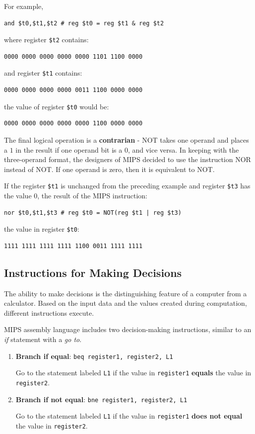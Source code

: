 \documentclass[10pt,a4paper]{article}
\begin{document}
For example, 
\begin{lstlisting}[numbers=none]
    and $t0,$t1,$t2 # reg $t0 = reg $t1 & reg $t2
\end{lstlisting}
where register \texttt{\$t2} contains:
\begin{lstlisting}[numbers=none]
    0000 0000 0000 0000 0000 1101 1100 0000
\end{lstlisting}
and register \texttt{\$t1} contains:
\begin{lstlisting}[numbers=none]
    0000 0000 0000 0000 0011 1100 0000 0000
\end{lstlisting}
the value of register \texttt{\$t0} would be:
\begin{lstlisting}[numbers=none]
    0000 0000 0000 0000 0000 1100 0000 0000
\end{lstlisting}

The final logical operation is a \textbf{contrarian} - NOT takes one operand and places a $1$ in the
result if one operand bit is a $0$, and vice versa. In keeping with the three-operand format, the
designers of MIPS decided to use the instruction NOR instead of NOT. If one operand is zero, then it
is equivalent to NOT.

If the register \texttt{\$t1} is unchanged from the preceding example and register \texttt{\$t3} has
the value 0, the result of the MIPS instruction:
\begin{lstlisting}[numbers=none]
    nor $t0,$t1,$t3 # reg $t0 = NOT(reg $t1 | reg $t3)
\end{lstlisting}
the value in register \texttt{\$t0}:
\begin{lstlisting}[numbers=none]
    1111 1111 1111 1111 1100 0011 1111 1111
\end{lstlisting}

\subsection{Instructions for Making Decisions}

The ability to make decisions is the distinguishing feature of a computer from a calculator. Based
on the input data and the values created during computation, different instructions execute.

MIPS assembly language includes two decision-making instructions, similar to an \textit{if}
statement with a \textit{go to}.
\begin{enumerate}
    \item \textbf{Branch if equal}: \texttt{beq register1, register2, L1}
    
    Go to the statement labeled \texttt{L1} if the value in \texttt{register1} \textbf{equals} the
    value in \texttt{register2}.
    
    \item \textbf{Branch if not equal}: \texttt{bne register1, register2, L1}
    
    Go to the statement labeled \texttt{L1} if the value in \texttt{register1} \textbf{does not equal} the value in \texttt{register2}.
\end{enumerate}
\end{document}
